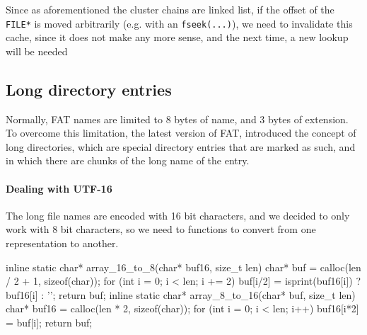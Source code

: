 \documentclass[a4paper,twoside,openright]{report}
\begin{document}
Since as aforementioned the cluster chains are linked list, if the offset of the \texttt{FILE*} is moved arbitrarily (e.g. with an \texttt{fseek(...)}), we need to invalidate this cache, since it does not make any more sense, and the next time, a new lookup will be needed

\subsection{Long directory entries}
Normally, FAT names are limited to 8 bytes of name, and 3 bytes of extension.
To overcome this limitation, the latest version of FAT, introduced the concept of long directories, which are special directory entries that are marked as such, and in which there are chunks of the long name of the entry.

\paragraph{Dealing with UTF-16}
The long file names are encoded with 16 bit characters, and we decided to only work with 8 bit characters, so we need to functions to convert from one representation to another.
\begin{pandacode}
inline static char* array_16_to_8(char* buf16, size_t len) {
    char* buf = calloc(len / 2 + 1, sizeof(char));
    for (int i = 0; i < len; i += 2) {
        buf[i/2] = isprint(buf16[i]) ? buf16[i] : '\0';
    }
    return buf;
}
inline static char* array_8_to_16(char* buf, size_t len) {
    char* buf16 = calloc(len * 2, sizeof(char));
    for (int i = 0; i < len; i++) {
        buf16[i*2] = buf[i];
    }
    return buf;
}
\end{pandacode} 
\end{document}
